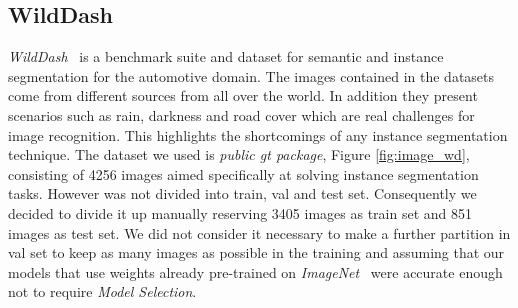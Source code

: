 \documentclass[10pt,twocolumn,letterpaper]{article}
\begin{document}
\subsection{WildDash}
\label{dataset_wd}
\textit{WildDash}~\cite{wildDash} is a benchmark suite and dataset for semantic and instance segmentation for the automotive domain. The images contained in the datasets come from different sources from all over the world. In addition they present scenarios such as rain, darkness and road cover which are real challenges for image recognition. This highlights the shortcomings of any instance segmentation technique.
The dataset we used is \textit{public gt package}, Figure \ref{fig:image_wd}, consisting of 4256 images aimed specifically at solving instance segmentation tasks. However was not divided into train, val and test set. Consequently we decided to divide it up manually reserving 3405 images as train set and 851 images as test set. We did not consider it necessary to make a further partition in val set to keep as many images as possible in the training and assuming that our models that use weights already pre-trained on \textit{ImageNet}~\cite{imagenet} were accurate enough not to require \textit{Model Selection}.
\end{document}
